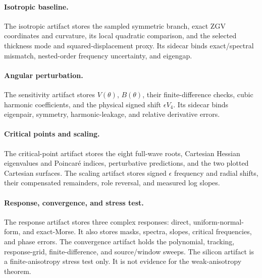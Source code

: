 \paragraph{Isotropic baseline.}
The isotropic artifact stores the sampled symmetric branch, exact ZGV
coordinates and curvature, its local quadratic comparison, and the selected
thickness mode and squared-displacement proxy.  Its sidecar binds exact/spectral mismatch,
nested-order frequency uncertainty, and eigengap.

\paragraph{Angular perturbation.}
The sensitivity artifact stores \(V(\theta)\), \(B(\theta)\), their
finite-difference checks, cubic harmonic coefficients, and the physical
signed shift \(\epsilon V_4\).  Its sidecar binds eigenpair, symmetry,
harmonic-leakage, and relative derivative errors.

\paragraph{Critical points and scaling.}
The critical-point artifact stores the eight full-wave roots, Cartesian
Hessian eigenvalues and Poincar\'e indices, perturbative predictions, and the
two plotted Cartesian surfaces.  The scaling artifact stores signed
\(\epsilon\) frequency and radial shifts, their compensated remainders, role
reversal, and measured log slopes.

\paragraph{Response, convergence, and stress test.}
The response artifact stores three complex responses: direct,
uniform-normal-form, and exact-Morse.  It also stores masks, spectra, slopes,
critical frequencies, and phase errors.  The convergence artifact holds the
polynomial, tracking, response-grid, finite-difference, and source/window
sweeps.  The silicon artifact is a finite-anisotropy stress test only.  It is
not evidence for the weak-anisotropy theorem.

